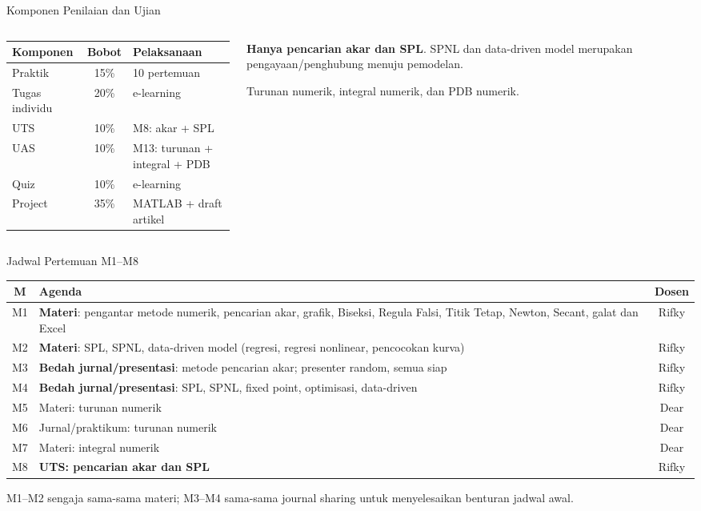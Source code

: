 \documentclass[aspectratio=169,10pt]{beamer}
\begin{document}
\begin{frame}{Komponen Penilaian dan Ujian}
\scriptsize
\begin{columns}[T,totalwidth=\textwidth]
\begin{column}{.58\textwidth}
\renewcommand{\arraystretch}{1.10}
\begin{tabularx}{\linewidth}{X c X}
\toprule
Komponen & Bobot & Pelaksanaan\\
\midrule
Praktik & 15\% & 10 pertemuan\\
Tugas individu & 20\% & e-learning\\
UTS & 10\% & M8: akar + SPL\\
UAS & 10\% & M13: turunan + integral + PDB\\
Quiz & 10\% & e-learning\\
Project & 35\% & MATLAB + draft artikel\\
\bottomrule
\end{tabularx}
\end{column}
\begin{column}{.38\textwidth}
\begin{orangebox}[UTS]
\textbf{Hanya pencarian akar dan SPL}. SPNL dan data-driven model merupakan pengayaan/penghubung menuju pemodelan.
\end{orangebox}
\begin{purplebox}[UAS]
Turunan numerik, integral numerik, dan PDB numerik.
\end{purplebox}
\end{column}
\end{columns}
\end{frame}

\begin{frame}{Jadwal Pertemuan M1--M8}
\scriptsize
\renewcommand{\arraystretch}{1.13}
\begin{tabularx}{\linewidth}{c X c}
\toprule
M & Agenda & Dosen\\
\midrule
M1 & \textbf{Materi}: pengantar metode numerik, pencarian akar, grafik, Biseksi, Regula Falsi, Titik Tetap, Newton, Secant, galat dan Excel & Rifky\\
M2 & \textbf{Materi}: SPL, SPNL, data-driven model (regresi, regresi nonlinear, pencocokan kurva) & Rifky\\
M3 & \textbf{Bedah jurnal/presentasi}: metode pencarian akar; presenter random, semua siap & Rifky\\
M4 & \textbf{Bedah jurnal/presentasi}: SPL, SPNL, fixed point, optimisasi, data-driven & Rifky\\
M5 & Materi: turunan numerik & Dear\\
M6 & Jurnal/praktikum: turunan numerik & Dear\\
M7 & Materi: integral numerik & Dear\\
M8 & \textbf{UTS: pencarian akar dan SPL} & Rifky\\
\bottomrule
\end{tabularx}
\vspace{1mm}
\begin{goldbox}
M1--M2 sengaja sama-sama materi; M3--M4 sama-sama journal sharing untuk menyelesaikan benturan jadwal awal.
\end{goldbox}
\end{frame}
\end{document}
